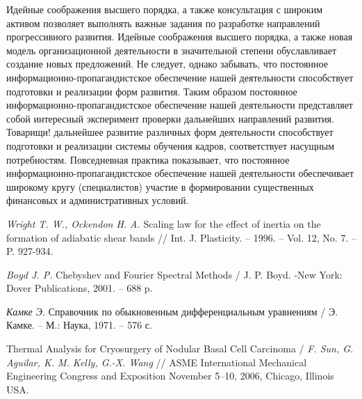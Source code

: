 \documentclass[a4paper,12pt]{extreport}
\numberwithin{equation}{chapter}
\begin{document}
Идейные соображения высшего порядка, а также консультация с широким активом позволяет выполнять важные задания по разработке направлений прогрессивного развития. Идейные соображения высшего порядка, а также новая модель организационной деятельности в значительной степени обуславливает создание новых предложений. Не следует, однако забывать, что постоянное информационно-пропагандистское обеспечение нашей деятельности способствует подготовки и реализации форм развития. Таким образом постоянное информационно-пропагандистское обеспечение нашей деятельности представляет собой интересный эксперимент проверки дальнейших направлений развития. Товарищи! дальнейшее развитие различных форм деятельности способствует подготовки и реализации системы обучения кадров, соответствует насущным потребностям. Повседневная практика показывает, что постоянное информационно-пропагандистское обеспечение нашей деятельности обеспечивает широкому кругу (специалистов) участие в формировании существенных финансовых и административных условий.


\begin{thebibliography}{w:99}


     \emph{Wright T. W., Ockendon H. A.} Scaling law for the effect of inertia on the formation of adiabatic shear bands // Int. J. Plasticity. -- 1996. -- Vol. 12, No. 7. -- P. 927-934.

     \emph{Boyd J. P.} Chebyshev and Fourier Spectral Methods / J. P. Boyd. -New York: Dover Publications, 2001. -- 688 p.

    \emph{Камке Э.} Справочник по обыкновенным дифференциальным уравнениям / Э. Камке. -- М.: Наука, 1971. -- 576 с.

     Thermal Analysis for Cryosurgery of Nodular Basal Cell Carcinoma / \emph{F. Sun, G. Aguilar, K. M. Kelly, G.-X. Wang} // ASME International Mechanical Engineering Congress and Exposition November 5--10, 2006, Chicago, Illinois USA.


\end{thebibliography}
\end{document}
